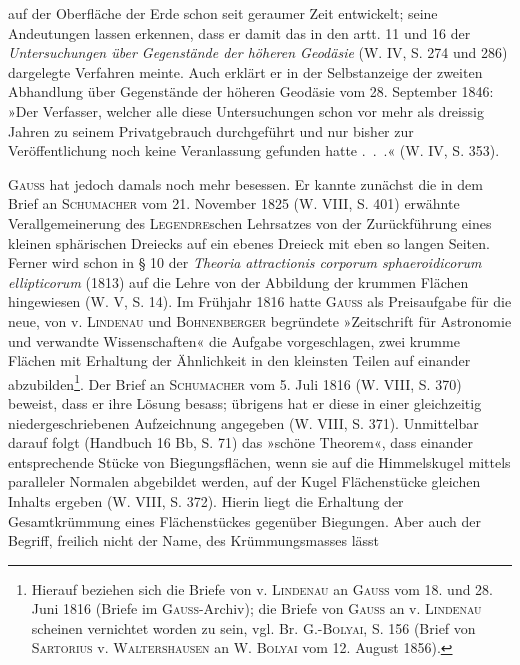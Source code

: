 \clearpage{}\setcounter{footnote}{0}
\noindent auf der Oberfläche der Erde schon seit geraumer Zeit entwickelt; seine Andeutungen
lassen erkennen, dass er damit das in den artt. 11 und 16 der
\textit{Untersuchungen über Gegenstände der höheren Geodäsie} (W. IV, S. 274 und
286) dargelegte Verfahren meinte. Auch erklärt er in der Selbstanzeige der
zweiten Abhandlung über Gegenstände der höheren Geodäsie vom 28. September
1846: »Der Verfasser, welcher alle diese Untersuchungen schon vor
mehr als dreissig Jahren zu seinem Privatgebrauch durchgeführt und nur bisher
zur Veröffentlichung noch keine Veranlassung gefunden hatte .\ .\ .« (W. IV, S. 353).
\par
\textsc{Gauss} hat jedoch damals noch mehr besessen. Er kannte zunächst die
in dem Brief an \textsc{Schumacher} vom 21. November 1825 (W. VIII, S. 401) erwähnte
Verallgemeinerung des \textsc{Legendre}schen Lehrsatzes von der Zurückführung
eines kleinen sphärischen Dreiecks auf ein ebenes Dreieck mit eben
so langen Seiten. Ferner wird schon in § 10 der \textit{Theoria attractionis corporum
sphaeroidicorum ellipticorum} (1813) auf die Lehre von der Abbildung der krummen
Flächen hingewiesen (W. V, S. 14). Im Frühjahr 1816 hatte \textsc{Gauss} als
Preisaufgabe für die neue, von v. \textsc{Lindenau} und \textsc{Bohnenberger} begründete
»Zeitschrift für Astronomie und verwandte Wissenschaften« die Aufgabe vorgeschlagen,
zwei krumme Flächen mit Erhaltung der Ähnlichkeit in den kleinsten
Teilen auf einander abzubilden\footnote{Hierauf beziehen sich die Briefe von v. \textsc{Lindenau} an \textsc{Gauss} vom 18. und 28. Juni 1816 (Briefe im \textsc{Gauss}-Archiv); die Briefe von \textsc{Gauss} an v. \textsc{Lindenau} scheinen vernichtet worden zu sein, vgl. Br. G.-\textsc{Bolyai}, S. 156 (Brief von \textsc{Sartorius} v. \textsc{Waltershausen} an W. \textsc{Bolyai} vom 12. August 1856).}. Der Brief an \textsc{Schumacher} vom 5. Juli 1816
(W. VIII, S. 370) beweist, dass er ihre Lösung besass; übrigens hat er diese
in einer gleichzeitig niedergeschriebenen Aufzeichnung angegeben (W. VIII,
S. 371). Unmittelbar darauf folgt (Handbuch 16 Bb, S. 71) das »schöne Theorem«,
dass einander entsprechende Stücke von Biegungsflächen, wenn sie auf
die Himmelskugel mittels paralleler Normalen abgebildet werden, auf der
Kugel Flächenstücke gleichen Inhalts ergeben (W. VIII, S. 372). Hierin liegt
die Erhaltung der Gesamtkrümmung eines Flächenstückes gegenüber Biegungen.
Aber auch der Begriff, freilich nicht der Name, des Krümmungsmasses lässt

